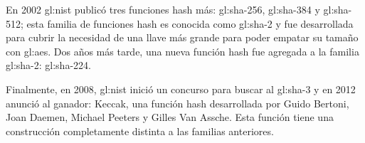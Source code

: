 En 2002 \gls{gl:nist} publicó tres funciones hash más:
\gls{gl:sha}-256, \gls{gl:sha}-384 y \gls{gl:sha}-512; esta
familia de funciones hash es conocida como \gls{gl:sha}-2 y fue
desarrollada para cubrir la necesidad de una llave más grande para poder
empatar su tamaño con \gls{gl:aes}. Dos años más tarde, una nueva
función hash fue agregada a la familia \gls{gl:sha}-2:
\gls{gl:sha}-224.

Finalmente, en 2008, \gls{gl:nist} inició un concurso para buscar al
\gls{gl:sha}-3 y en 2012 anunció al ganador: Keccak, una función hash
desarrollada por Guido Bertoni, Joan Daemen, Michael Peeters y Gilles Van
Assche. Esta función tiene una construcción completamente distinta a las
familias anteriores.
